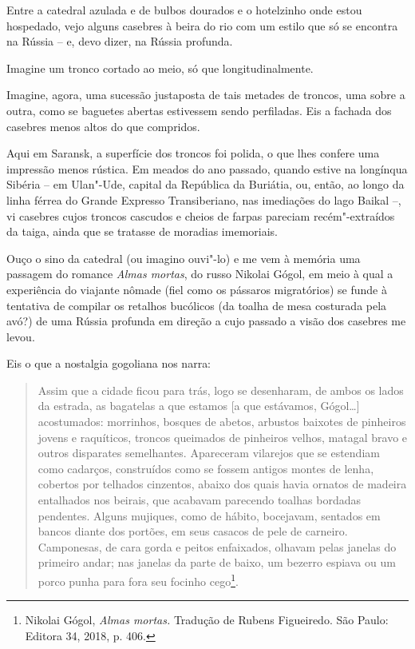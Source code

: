 Entre a catedral azulada e de bulbos dourados e o hotelzinho onde estou
hospedado, vejo alguns casebres à beira do rio com um estilo que só se
encontra na Rússia -- e, devo dizer, na Rússia profunda.

Imagine um tronco cortado ao meio, só que longitudinalmente.

Imagine, agora, uma sucessão justaposta de tais metades de troncos, uma
sobre a outra, como se baguetes abertas estivessem sendo perfiladas. Eis
a fachada dos casebres menos altos do que compridos.

Aqui em Saransk, a superfície dos troncos foi polida, o que lhes confere
uma impressão menos rústica. Em meados do ano passado, quando estive na
longínqua Sibéria -- em Ulan"-Ude, capital da República da Buriátia, ou,
então, ao longo da linha férrea do Grande Expresso Transiberiano, nas
imediações do lago Baikal --, vi casebres cujos troncos cascudos e
cheios de farpas pareciam recém"-extraídos da taiga, ainda que se
tratasse de moradias imemoriais.

Ouço o sino da catedral (ou imagino ouvi"-lo) e me vem à memória uma
passagem do romance \emph{Almas mortas}, do russo Nikolai Gógol, em meio
à qual a experiência do viajante nômade (fiel como os pássaros
migratórios) se funde à tentativa de compilar os retalhos bucólicos (da
toalha de mesa costurada pela avó?) de uma Rússia profunda em direção a
cujo passado a visão dos casebres me levou.

Eis o que a nostalgia gogoliana nos narra:

\begin{quote}
Assim que a cidade ficou para trás, logo se desenharam, de ambos os
lados da estrada, as bagatelas a que estamos {[}a que estávamos,
Gógol\ldots{}{]} acostumados: morrinhos, bosques de abetos, arbustos baixotes
de pinheiros jovens e raquíticos, troncos queimados de pinheiros velhos,
matagal bravo e outros disparates semelhantes. Apareceram vilarejos que
se estendiam como cadarços, construídos como se fossem antigos montes de
lenha, cobertos por telhados cinzentos, abaixo dos quais havia ornatos
de madeira entalhados nos beirais, que acabavam parecendo toalhas
bordadas pendentes. Alguns mujiques, como de hábito, bocejavam, sentados
em bancos diante dos portões, em seus casacos de pele de carneiro.
Camponesas, de cara gorda e peitos enfaixados, olhavam pelas janelas do
primeiro andar; nas janelas da parte de baixo, um bezerro espiava ou um
porco punha para fora seu focinho cego\footnote{Nikolai Gógol,
  \emph{Almas mortas.} Tradução de Rubens Figueiredo. São Paulo: Editora
  34, 2018, p. 406.}.
\end{quote}

